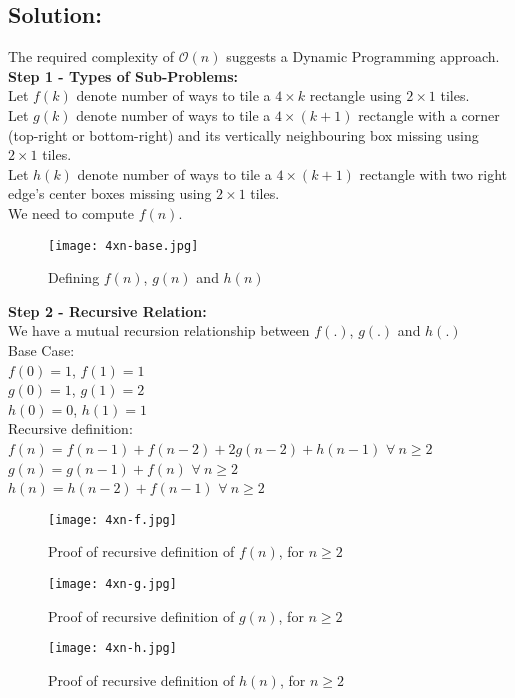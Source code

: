 \documentclass[11pt, fleqn]{article}
\begin{document}
\subsection*{Solution:}

The required complexity of $\mathcal{O}(n)$ suggests a Dynamic Programming approach. \\

\textbf{Step 1 - Types of Sub-Problems:}\\
Let $f(k)$ denote number of ways to tile a $4 \times k$ rectangle using $2 \times 1$ tiles.\\
Let $g(k)$ denote number of ways to tile a $4 \times (k+1)$ rectangle with a corner (top-right or bottom-right) and its vertically neighbouring box missing using $2 \times 1$ tiles.\\
Let $h(k)$ denote number of ways to tile a $4 \times (k+1)$ rectangle with two right edge's center boxes missing using $2 \times 1$ tiles.\\
We need to compute $f(n)$.
\begin{figure}[H]
    \centering
    \texttt{[image: 4xn-base.jpg]}
    \caption{Defining $f(n)$, $g(n)$ and $h(n)$}
\end{figure}


\textbf{Step 2 - Recursive Relation:}\\
We have a mutual recursion relationship between $f(.)$, $g(.)$ and $h(.)$ \\
Base Case: \\
$f(0) = 1$, $f(1) = 1$\\
$g(0) = 1$, $g(1) = 2$\\
$h(0) = 0$, $h(1) = 1$\\
Recursive definition: \\
$f(n) = f(n-1) + f(n-2) + 2g(n-2) + h(n-1)$ $\forall \ n \ge 2$\\
$g(n) = g(n-1) + f(n)$ $\forall \ n \ge 2$\\
$h(n) = h(n-2) + f(n-1)$ $\forall \ n \ge 2$

\begin{figure}[H]
    \centering
    \texttt{[image: 4xn-f.jpg]}
    \caption{Proof of recursive definition of $f(n)$, for $n \ge 2$}
\end{figure}
\begin{figure}[H]
    \centering
    \texttt{[image: 4xn-g.jpg]}
    \caption{Proof of recursive definition of $g(n)$, for $n \ge 2$}
\end{figure}
\begin{figure}[H]
    \centering
    \texttt{[image: 4xn-h.jpg]}
    \caption{Proof of recursive definition of $h(n)$, for $n \ge 2$}
\end{figure}
\end{document}
